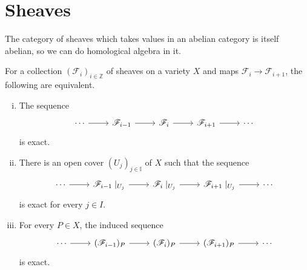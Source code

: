 \section{Sheaves}
The category of sheaves which takes values in an abelian category is
itself abelian, so we can do homological algebra in it.

\begin{thm}\label{thm:ses_equivalence}
  For a collection $(\mathscr{F}_{i})_{i\in\mathbb{Z}}$ of sheaves on
  a variety $X$ and maps ${\mathscr{F}_{i}\to\mathscr{F}_{i+1}}$,
  the following are equivalent.
  \begin{enumerate}[(i)]
    \item The sequence
          \[
          \begin{tikzcd}
            \cdots \arrow{r} & \mathscr{F}_{i-1}\arrow{r}
            & \mathscr{F}_{i}\arrow{r} & \mathscr{F}_{i+1}\arrow{r} & \cdots
          \end{tikzcd}
          \]
          is exact.
    \item There is an open cover $(U_{j})_{j\in\mathbb{I}}$ of $X$ such that
          the sequence
          \[
          \begin{tikzcd}
            \cdots \arrow{r} & \mathscr{F}_{i-1}\mid_{U_{j}}\arrow{r}
            & \mathscr{F}_{i}\mid_{U_{j}}\arrow{r}
            & \mathscr{F}_{i+1}\mid_{U_{j}}\arrow{r} & \cdots
          \end{tikzcd}
          \]
          is exact for every $j\in I$.
    \item For every $P\in X$, the induced sequence
          \[
          \begin{tikzcd}
            \cdots \arrow{r} & (\mathscr{F}_{i-1})_{P}\arrow{r}
            & (\mathscr{F}_{i})_{P}\arrow{r}
            & (\mathscr{F}_{i+1})_{P}\arrow{r} & \cdots
          \end{tikzcd}
          \]
          is exact.
  \end{enumerate}
\end{thm}
